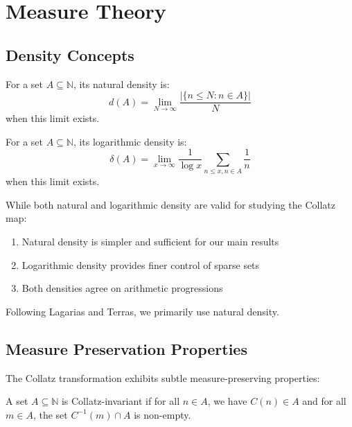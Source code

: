 \section{Measure Theory}\label{sec:measure_theory}

\subsection{Density Concepts}

\begin{definition}
For a set $A \subseteq \mathbb{N}$, its natural density is:
\[
d(A) = \lim_{N \to \infty} \frac{|\{n \leq N : n \in A\}|}{N}
\]
when this limit exists.
\end{definition}

\begin{definition}
For a set $A \subseteq \mathbb{N}$, its logarithmic density is:
\[
\delta(A) = \lim_{x \to \infty} \frac{1}{\log x} \sum_{n \leq x, n \in A} \frac{1}{n}
\]
when this limit exists.
\end{definition}

\begin{remark}
While both natural and logarithmic density are valid for studying the Collatz map:
\begin{enumerate}
\item Natural density is simpler and sufficient for our main results
\item Logarithmic density provides finer control of sparse sets
\item Both densities agree on arithmetic progressions
\end{enumerate}
Following Lagarias and Terras, we primarily use natural density.
\end{remark}

\subsection{Measure Preservation Properties}

The Collatz transformation exhibits subtle measure-preserving properties:

\begin{definition}
A set $A \subseteq \mathbb{N}$ is Collatz-invariant if for all $n \in A$, we have $C(n) \in A$ and for all $m \in A$, the set $C^{-1}(m) \cap A$ is non-empty.
\end{definition}

